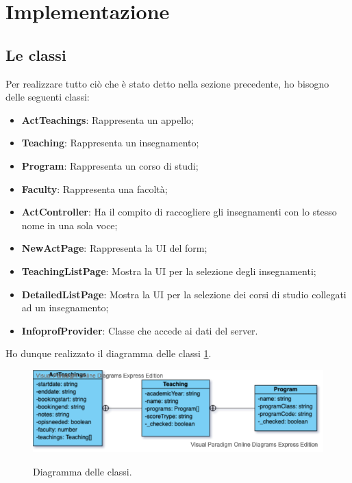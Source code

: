 \documentclass[Lau, oneside]{sapthesis}%
\begin{document}
\newpage
\section{Implementazione}
\label{sec:dev}
\subsection{Le classi}
Per realizzare tutto ciò che è stato detto nella sezione precedente, ho bisogno delle seguenti classi:
\begin{itemize}
	\item \textbf{ActTeachings}: Rappresenta un appello;
	\item \textbf{Teaching}: Rappresenta un insegnamento;
	\item \textbf{Program}: Rappresenta un corso di studi;
	\item \textbf{Faculty}: Rappresenta una facoltà;
	\item \textbf{ActController}: Ha il compito di raccogliere gli insegnamenti con lo stesso nome in una sola voce;
	\item \textbf{NewActPage}: Rappresenta la UI del form;
	\item \textbf{TeachingListPage}: Mostra la UI per la selezione degli insegnamenti;
	\item \textbf{DetailedListPage}: Mostra la UI per la selezione dei corsi di studio collegati ad un insegnamento;
	\item \textbf{InfoprofProvider}: Classe che accede ai dati del server.
\end{itemize}

Ho dunque realizzato il diagramma delle classi \ref{fig:classDiagram}.
\begin{figure}[H]
	\caption{Diagramma delle classi.}
	\centering
	\includegraphics[width=1\textwidth]{diagrams/classDiagram}
	\label{fig:classDiagram}
\end{figure}
\end{document}
